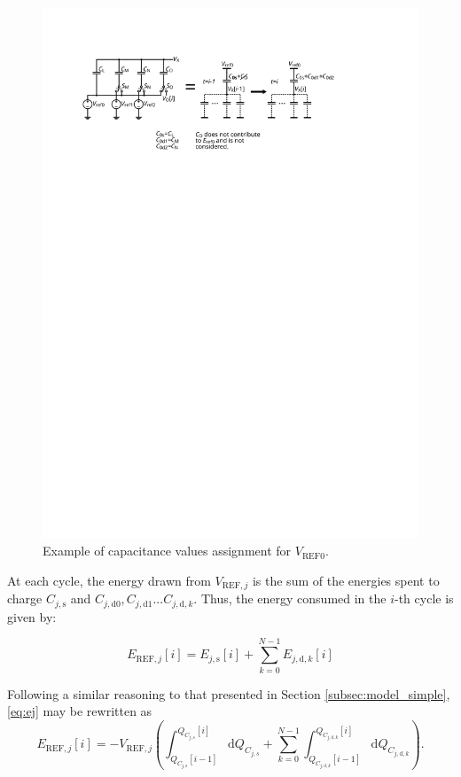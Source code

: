 \documentclass[]{article}
\begin{document}
\begin{figure}
	\centering
	\includegraphics[scale=1.0]{figures/capacitor_a}
	\caption{Example of capacitance values assignment for $V_\mathrm{REF0}$.}
	\label{fig:capacitor_a}
\end{figure}


At each cycle, the energy drawn from $V_{\mathrm{REF},j}$ is the sum of the energies spent to charge $C_{j,\mathrm{s}}$ and $C_{j,\mathrm{d}0},C_{j,\mathrm{d}1}...C_{j,\mathrm{d},k}$. Thus, the energy consumed in the $i$-th cycle is given by:

\begin{equation}
	E_{\mathrm{REF},j}[i] = E_{j,\mathrm{s}}[i]+\sum\limits_{k=0}^{N-1}E_{j,\mathrm{d},k}[i]
	\label{eq:ej}
\end{equation}

Following a similar reasoning to that presented in Section \ref{subsec:model_simple}, \eqref{eq:ej} may be rewritten as
\begin{equation}
	E_{\mathrm{REF},j}[i] = - V_{\mathrm{REF},j} \left(
	\int_{Q_{C_{j,\mathrm{s}}}[i-1]}^{Q_{C_{j,s}}[i]} \mathrm{d}Q_{C_{j,s}}  +
	\sum\limits_{k=0}^{N-1}\int_{Q_{C_{j,\mathrm{d},k}}[i-1]}^{Q_{C_{j,\mathrm{d},k}}[i]} \mathrm{d}Q_{C_{j,\mathrm{d},k}}
	\right).
\end{equation}
\end{document}
